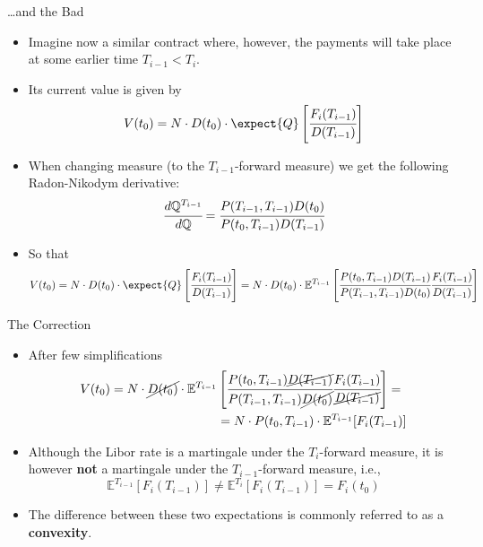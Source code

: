 \documentclass{beamer}
\begin{document}
\begin{frame}{\ldots and the Bad}
	\begin{itemize}
		\item<1-> Imagine now a similar contract where, however, the payments will take place at some earlier time $T_{i-1} < T_i$. \item<2->Its current value is given by
		\begin{equation*}
			V(t_0) = N\cdot D(t_0)\cdot\expect{Q}\left[\cfrac{F_i(T_{i-1})}{D(T_{i-1})}\right]
		\end{equation*}
		\item<3-> When changing measure (to the $T_{i-1}$-forward measure) we get the following Radon-Nikodym derivative:
		\begin{equation*}
			\cfrac{d\mathbb{Q}^{T_{i-1}}}{d\mathbb{Q}}=\cfrac{P(T_{i-1},T_{i-1})D(t_0)}{P(t_0,T_{i-1})D(T_{i-1})}
		\end{equation*}
		\item<4->So that
		\begin{equation*}
			V(t_0) = N\cdot D(t_0)\cdot\expect{Q}\left[\cfrac{F_i(T_{i-1})}{D(T_{i-1})}\right] = N\cdot D(t_0)\cdot\mathbb{E}^{T_{i-1}}\left[\cfrac{P(t_0,T_{i-1})D(T_{i-1})}{P(T_{i-1},T_{i-1})D(t_0)}\cfrac{F_i(T_{i-1})}{D(T_{i-1})}\right]
		\end{equation*}
	\end{itemize}
\end{frame}

\begin{frame}{The Correction}
	\begin{itemize}
		\item<1-> After few simplifications
		\begin{equation*}
			\begin{aligned}
				V(t_0) = N\cdot \cancel{D(t_0)}\cdot\mathbb{E}^{T_{i-1}}&\left[\cfrac{P(t_0,T_{i-1})\cancel{D(T_{i-1})}}{P(T_{i-1},T_{i-1})\cancel{D(t_0)}}\cfrac{F_i(T_{i-1})}{\cancel{D(T_{i-1})}}\right] = \\
				&= N\cdot P(t_0,T_{i-1})\cdot\mathbb{E}^{T_{i-1}}[F_i(T_{i-1})]
			\end{aligned}
		\end{equation*}
		\item<1-> Although the Libor rate is a martingale under the $T_i$-forward
		measure, it is however \textbf{not} a martingale under the $T_{i-1}$-forward measure, i.e.,
		\begin{equation*}
			\mathbb{E}^{T_{i-1}}\left[F_i(T_{i-1})\right]\neq \mathbb{E}^{T_i}\left[F_i(T_{i-1})\right] = F_i(t_0)
		\end{equation*}
		\item<2-> The difference between these two expectations is commonly referred to as a \textbf{convexity}.
	\end{itemize}
\end{frame}
\end{document}
